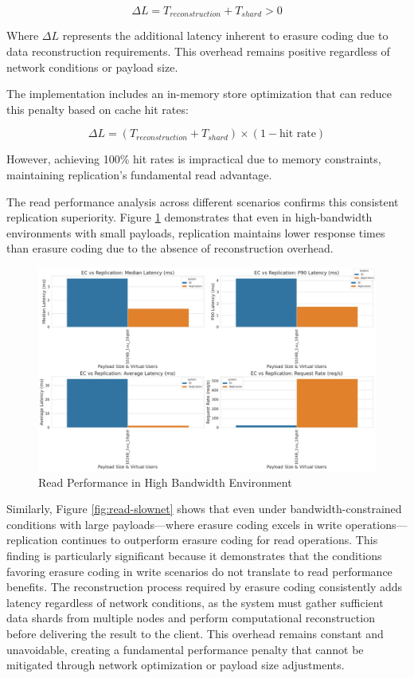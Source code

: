 \begin{equation}
\Delta L = T_{reconstruction} + T_{shard} > 0
\end{equation}

Where $\Delta L$ represents the additional latency inherent to erasure coding due to data reconstruction requirements. This overhead remains positive regardless of network conditions or payload size.

The implementation includes an in-memory store optimization that can reduce this penalty based on cache hit rates:

\begin{equation}
\Delta L = (T_{reconstruction} + T_{shard}) \times (1 - \text{hit rate})
\end{equation}

However, achieving 100\% hit rates is impractical due to memory constraints, maintaining replication's fundamental read advantage.

The read performance analysis across different scenarios confirms this consistent replication superiority. Figure \ref{fig:read-fastnet} demonstrates that even in high-bandwidth environments with small payloads, replication maintains lower response times than erasure coding due to the absence of reconstruction overhead.

\begin{figure}[ht]
\centering
\includegraphics[width=\columnwidth]{resources/chapter-4/read_smload_fastnet.png}
\caption{Read Performance in High Bandwidth Environment}
\label{fig:read-fastnet}
\end{figure}

Similarly, Figure \ref{fig:read-slownet} shows that even under bandwidth-constrained conditions with large payloads—where erasure coding excels in write operations—replication continues to outperform erasure coding for read operations. This finding is particularly significant because it demonstrates that the conditions favoring erasure coding in write scenarios do not translate to read performance benefits. The reconstruction process required by erasure coding consistently adds latency regardless of network conditions, as the system must gather sufficient data shards from multiple nodes and perform computational reconstruction before delivering the result to the client. This overhead remains constant and unavoidable, creating a fundamental performance penalty that cannot be mitigated through network optimization or payload size adjustments.

